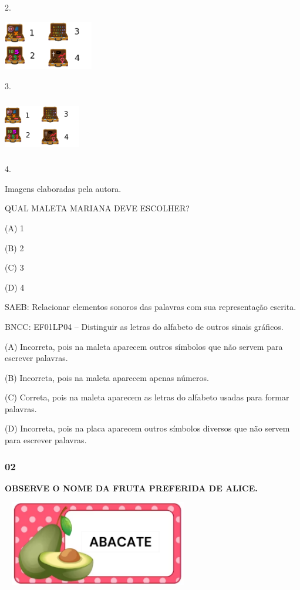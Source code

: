 2.

\includegraphics[width=1.55139in,height=0.85000in]{media/image209.png}

3.

\includegraphics[width=1.31218in,height=0.92930in]{media/image209.png}

4.

Imagens elaboradas pela autora.

QUAL MALETA MARIANA DEVE ESCOLHER?

(A) 1

(B) 2

(C) 3

(D) 4

SAEB:
Relacionar elementos sonoros das palavras com sua representação escrita.

BNCC: EF01LP04 -- Distinguir as letras do alfabeto de outros sinais
gráficos.

(A) Incorreta, pois na maleta aparecem outros símbolos que não servem
para escrever palavras.

(B) Incorreta, pois na maleta aparecem apenas números.

(C) Correta, pois na maleta aparecem as letras do alfabeto usadas para
formar palavras.

(D) Incorreta, pois na placa aparecem outros símbolos diversos que não
servem para escrever palavras.

\subsubsection{02}\label{section-42}

\textbf{OBSERVE O NOME DA FRUTA PREFERIDA DE ALICE.}

\includegraphics[width=3.32292in,height=1.46928in]{media/image212.png}

